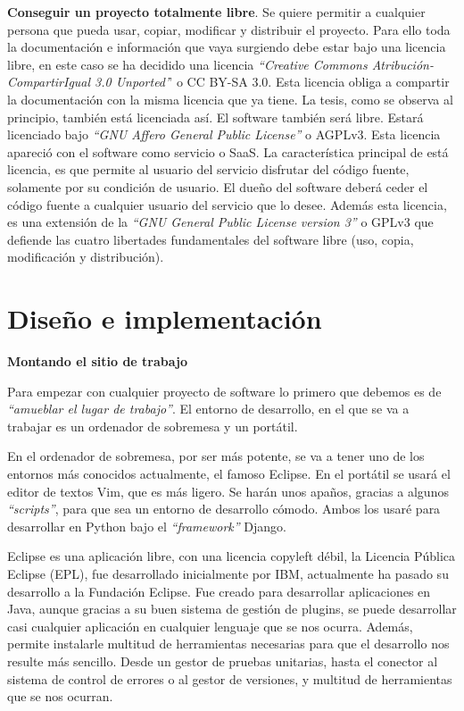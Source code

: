\documentclass[a4paper, 12pt]{book}
\begin{document}
\item \textbf{Conseguir un proyecto totalmente libre}. Se quiere permitir a 
cualquier persona que pueda usar, copiar, modificar y distribuir el proyecto. 
Para ello toda la documentación e información que vaya surgiendo debe estar bajo una 
licencia libre, en este caso se ha decidido una licencia \textit{``Creative Commons 
Atribución-CompartirIgual 3.0 Unported'}' o CC BY-SA 3.0. Esta licencia obliga a 
compartir la documentación con la misma licencia que ya tiene. La tesis, como 
se observa al principio, también está licenciada así. El software también 
será libre. Estará licenciado bajo \textit{``GNU Affero General Public License''} o 
AGPLv3. Esta licencia apareció con el software como servicio o SaaS. La 
característica principal de está licencia, es que permite al usuario del 
servicio disfrutar del código fuente, solamente por su condición de usuario. El 
dueño del software deberá ceder el código fuente a cualquier usuario del 
servicio que lo desee. Además esta licencia, es una extensión de la \textit{``GNU 
General Public License version 3''} o GPLv3 que defiende las cuatro 
libertades fundamentales del software libre (uso, copia, modificación y 
distribución).

\chapter{Diseño e implementación}
\label{chap:diseño_implementacion}

\textbf{Montando el sitio de trabajo}

Para empezar con cualquier proyecto de software lo primero que debemos es de 
\textit{``amueblar el lugar de trabajo''}. El entorno de desarrollo, en el que se va a 
trabajar es un ordenador de sobremesa y un portátil.

En el ordenador de sobremesa, por ser más potente, se va a tener uno de los 
entornos más conocidos actualmente, el famoso Eclipse. En el portátil se usará 
el editor de textos Vim, que es más ligero. Se harán unos apaños, gracias a 
algunos \textit{``scripts''}, para que sea un entorno de desarrollo cómodo. 
Ambos los usaré para desarrollar en Python bajo el \textit{``framework''} 
Django.

Eclipse es una aplicación libre, con una licencia copyleft débil, la Licencia 
Pública Eclipse (EPL), fue desarrollado  inicialmente por IBM, actualmente ha 
pasado su desarrollo a la Fundación Eclipse. Fue creado para desarrollar 
aplicaciones en Java, aunque gracias a su buen sistema de gestión de plugins, 
se puede desarrollar casi cualquier aplicación en cualquier lenguaje que se nos 
ocurra. Además, permite instalarle multitud de herramientas necesarias para que 
el desarrollo nos resulte más sencillo. Desde un gestor de pruebas unitarias, 
hasta el conector al sistema de control de errores o al gestor de versiones, y 
multitud de herramientas que se nos ocurran.
\end{document}
